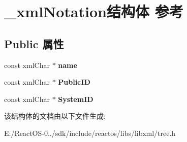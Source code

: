 \hypertarget{struct__xml_notation}{}\section{\+\_\+xml\+Notation结构体 参考}
\label{struct__xml_notation}
\subsection*{Public 属性}
\begin{DoxyCompactItemize}
\item 
\mbox{\label{struct__xml_notation_a15130985f4574a2cbb600c1d42461ee9}} 
const xml\+Char $\ast$ {\bfseries name}
\item 
\mbox{\label{struct__xml_notation_a66aa8801ce658a57f9139599fc8fb80f}} 
const xml\+Char $\ast$ {\bfseries Public\+ID}
\item 
\mbox{\label{struct__xml_notation_a521da3fcb5b3f193a00a9782c1fe5ff7}} 
const xml\+Char $\ast$ {\bfseries System\+ID}
\end{DoxyCompactItemize}


该结构体的文档由以下文件生成\+:\begin{DoxyCompactItemize}
\item 
E\+:/\+React\+O\+S-\/0../sdk/include/reactos/libs/libxml/tree.\+h\end{DoxyCompactItemize}
